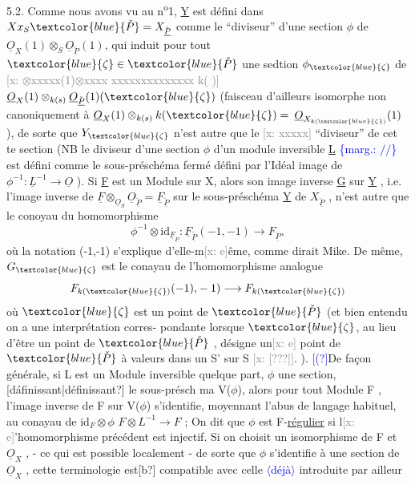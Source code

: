 \documentclass[11pt]{article}
\newcommand{\hand}[1]{\textcolor{blue}{#1}}
\let\over\relax
\newcommand{\over}[2]{\textcolor{gray}{#1}\textcolor{blue}{\ensuremath{^{\!\nearrow}}#2}}
\newcommand{\inserted}[2][]{\textcolor{blue}{$\langle$#2$\rangle$}}
\newcommand{\margin}[1]{\textcolor{blue}{\{\textsf{marg.:} #1\}}}
\newcommand{\xout}[1]{\textcolor{gray}{[\textsf{x:} #1]}}
\newcommand{\uline}[1]{\underline{#1}}
\newcommand{\unsure}[1]{[#1?]}
\begin{document}
5.2. Comme nous avons vu au n\textsuperscript{o}1, \underline{Y} est d\'efini dans $X x_S \hand{\check{P}} = X_{\check{\underline{P}}}$
comme le ``diviseur'' d'une section $\phi$ de $\underline{O}_X(1)\otimes_S \underline{O}_{\check{\underline{P}}}(1)$, qui induit pour
tout $\hand{\zeta} \in \hand{\check{P}}$ une sedtion $\phi_{\hand{\zeta}}$ de \xout{$\otimes$xxxxx(1)$\otimes$xxxx xxxxxxxxxxxxxx k( )} $\underline{O}_X(1)\otimes_{k(s)}\underline{O}_{\check{\underline{P}}}(1)(\hand{\zeta})$
(faisceau d'ailleurs isomorphe non canoniquement \`a $\underline{O}_X(1)\otimes_{k(s)}k(\hand{\zeta}) =$
$\underline{O}_{X_{k(\hand{\zeta})}}(1)$ ), de sorte que $Y_{\hand{\zeta}}$ n'est autre que le \xout{xxxxx} ``diviseur'' de cet
te section (NB le diviseur d'une section $\phi$ d'un module inversible \underline{L} \margin{$/\!/$}
est d\'efini comme le sous-pr\'esch\'ema ferm\'e d\'efini par l'Id\'eal image de
$\phi^{-1} : \underline{L}^{-1} \longrightarrow \underline{O}$ ). Si \underline{F} est un Module sur X, alors son image inverse \underline{G}
sur \underline{Y} , i.e. l'image inverse de $\underline{F}\otimes_{\underline{O}_S}\underline{O}_{\check{\underline{P}}} = \underline{F}_{\check{\underline{P}}}$ sur le sous-pr\'esch\'ema \underline{Y} de
$X_{\check{\underline{P}}}$ , n'est autre que le conoyau du homomorphisme
\[ \phi^{-1}\otimes \mathrm{id}_{\underline{F}_{\check{\underline{P}}}} : \underline{F}_{\check{\underline{P}}}(-1,-1) \longrightarrow F_{\check{\underline{P}}} , \]
o\`u la notation (-1,-1) s'explique d'elle-m\xout{e}\^eme, comme dirait Mike. De
m\^eme, $G_{\hand{\zeta}}$ est le conayau de l'homomorphisme analogue
\[ F_{k(\hand{\zeta})}(-1\over{)}{,}-1) \longrightarrow F_{k(\hand{\zeta})} \]
o\`u $\hand{\zeta}$ est un point de $\hand{\check{P}}$ (et bien entendu on a une interpr\'etation corres-%
pondante lorsque $\hand{\zeta}$, au lieu d'\^etre un point de $\hand{\check{P}}$ , d\'esigne un\xout{e} point
de $\hand{\check{P}}$ \`a valeurs dans un S' sur S \xout{\unsure{??}}. ). \hand{\unsure{(}}De fa\c{c}on g\'en\'erale, si L est un
Module inversible quelque part, $\phi$ une section, \unsure{d\'afinissant|d\'efinissant} le sous-pr\'esch
ma V($\phi$), alors pour tout Module F , l'image inverse de F sur V($\phi$)
s'identifie, moyennant l'abus de langage habituel, au conayau de $\mathrm{id}_F\otimes\phi$
$F\otimes L^{-1} \longrightarrow F$ ; On dit que $\phi$ est F-\uline{r\'egulier} si l\xout{e}'homomorphisme pr\'ec\'edent
est injectif. Si on choisit un isomorphisme de F et $\underline{O}_X$ , - ce qui
est possible localement - de sorte que $\phi$ s'identifie \`a une section de
$\underline{O}_X$ , cette terminologie est\unsure{b} compatible avec celle \inserted{d\'ej\`a} introduite par ailleur
\end{document}

